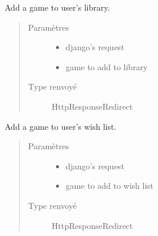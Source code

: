 \documentclass[letterpaper,10pt,french]{sphinxmanual}
\begin{document}
\begin{fulllineitems}
\label{\detokenize{library:library.views.add_to_library}}
Add a game to user’s library.
\begin{quote}\begin{description}
\item[{Paramètres}] \leavevmode\begin{itemize}
\item {}
 \textendash{} django’s request

\item {}
 \textendash{} game to add to library

\end{itemize}

\item[{Type renvoyé}] \leavevmode
HttpResponseRedirect

\end{description}\end{quote}

\end{fulllineitems}


\begin{fulllineitems}
\label{\detokenize{library:library.views.add_wish}}
Add a game to user’s wish list.
\begin{quote}\begin{description}
\item[{Paramètres}] \leavevmode\begin{itemize}
\item {}
 \textendash{} django’s request

\item {}
 \textendash{} game to add to wish list

\end{itemize}

\item[{Type renvoyé}] \leavevmode
HttpResponseRedirect

\end{description}\end{quote}

\end{fulllineitems}
\end{document}
